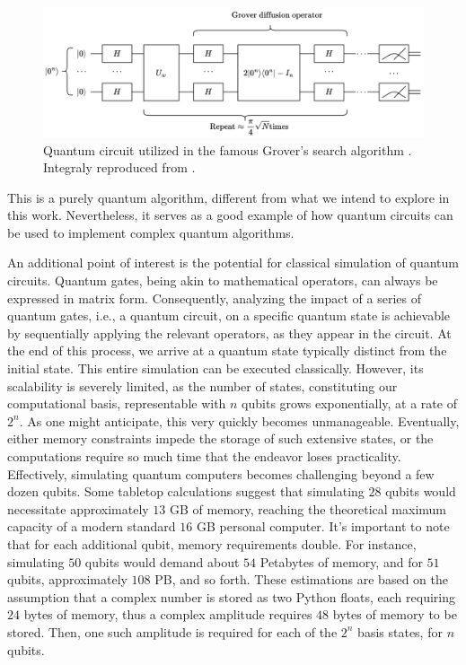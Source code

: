 \begin{figure}[H]
    \centering
    \includegraphics[width=\textwidth]{Figures/Diagrams/Grover_Circuit.png}
    \caption{Quantum circuit utilized in the famous Grover's search algorithm \cite{Grover}. Integraly reproduced from \cite{e26030216}.}
    \label{fig:QCircuit}
\end{figure}
\noindent This is a purely quantum algorithm, different from what we intend to explore in this work. Nevertheless, it serves as a good example of how quantum circuits can be used to implement complex quantum algorithms.

An additional point of interest is the potential for classical simulation of quantum circuits. Quantum gates, being akin to mathematical operators, can always be expressed in matrix form. Consequently, analyzing the impact of a series of quantum gates, i.e., a quantum circuit, on a specific quantum state is achievable by sequentially applying the relevant operators, as they appear in the circuit. At the end of this process, we arrive at a quantum state typically distinct from the initial state. This entire simulation can be executed classically. However, its scalability is severely limited, as the number of states, constituting our computational basis, representable with $n$ qubits grows exponentially, at a rate of $2^n$. As one might anticipate, this very quickly becomes unmanageable. Eventually, either memory constraints impede the storage of such extensive states, or the computations require so much time that the endeavor loses practicality. Effectively, simulating quantum computers becomes challenging beyond a few dozen qubits. Some tabletop calculations suggest that simulating $28$ qubits would necessitate approximately $13$ GB of memory, reaching the theoretical maximum capacity of a modern standard $16$ GB personal computer. It's important to note that for each additional qubit, memory requirements double. For instance, simulating $50$ qubits would demand about $54$ Petabytes of memory, and for $51$ qubits, approximately $108$ PB, and so forth. These estimations are based on the assumption that a complex number is stored as two Python floats, each requiring $24$ bytes of memory, thus a complex amplitude requires $48$ bytes of memory to be stored. Then, one such amplitude is required for each of the $2^{n}$ basis states, for $n$ qubits.

